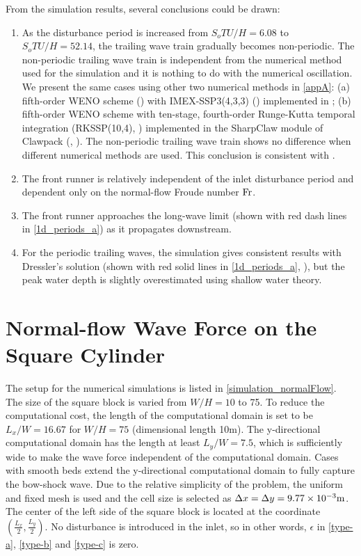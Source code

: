 \documentclass{jfm}
\newcommand{\fr}{{\rm{Fr}}}
\begin{document}
From the simulation results, several conclusions could be drawn: 
\begin{enumerate}
\item As the disturbance period is increased from  $S_oTU/H=6.08$ to $S_oTU/H=52.14$, the trailing wave train gradually becomes non-periodic. The non-periodic trailing wave train is independent from the numerical method used for the simulation and it is nothing to do with the numerical oscillation. We present the same cases using other two numerical methods in \autoref{appA}: (a) fifth-order WENO scheme (\cite{Jiang1996}) with IMEX-SSP3(4,3,3) (\cite{Pareschi2005}) implemented in \cite{Yu2021}; (b)  fifth-order WENO scheme with ten-stage, fourth-order Runge-Kutta temporal integration (RKSSP(10,4), \cite{Ketcheson2008})  implemented in the SharpClaw module of Clawpack (\cite{KetParLev13}, \cite{clawpack2021}). The non-periodic trailing wave train shows no difference when different  numerical methods are used.  This conclusion is consistent with \cite{Cao2015}.




\item The front runner is relatively independent of the inlet disturbance period and dependent only on the normal-flow Froude number $\fr$. 

\item The front runner approaches the long-wave limit (shown with red dash lines in \autoref{1d_periods_a}) as it propagates downstream.

\item For the periodic trailing waves, the simulation gives consistent results with Dressler's solution (shown with red solid lines in \autoref{1d_periods_a}, \cite{Dressler1949}), but the peak water depth is slightly overestimated using shallow water theory.

\end{enumerate}


\section{Normal-flow Wave Force on the Square Cylinder}
The setup for the numerical simulations is listed in \autoref{simulation_normalFlow}. The size of the square block is varied from $W/H=10$ to 75. To reduce the computational cost, the length of the computational domain is set to be $L_x/W=16.67$ for $W/H=75$ (dimensional length 10m). The y-directional computational domain has the length at least $L_y/W=7.5$, which is sufficiently wide to make the  wave force independent of the computational domain. Cases with smooth beds extend the y-directional computational domain to fully capture the bow-shock wave.  Due to the relative simplicity of the problem, the uniform and fixed mesh is used and the cell size is selected as $\Delta x = \Delta y = 9.77\times 10^{-3} {\rm{m}}$. The center of the left side of the square block is located at the coordinate $(\frac{L_x}{2}, \frac{L_y}{2})$. No disturbance is introduced in the inlet, so in other words, $\epsilon$ in \autoref{type-a}, \autoref{type-b} and \autoref{type-c} is zero.
\end{document}
